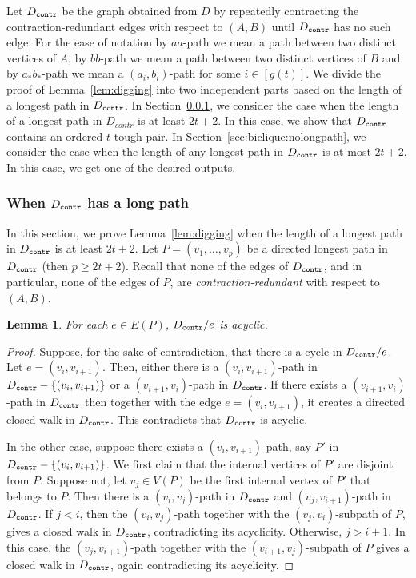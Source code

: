 \documentclass[a4paper,11pt]{article}
\theoremstyle{plain}
\newtheorem{lemma}[theorem]{Lemma}
\newtheorem{identification rule}{Identification Rule}
\theoremstyle{definition}
\theoremstyle{remark}
\newcommand{\toughpair}{tough-pair}
\newcommand{\contr}{\textnormal{\texttt{contr}}}
\newcommand{\Dcontr}{D_{\contr}}
\begin{document}
Let $\Dcontr$ be the graph obtained from $D$ by repeatedly contracting the contraction-redundant edges with respect to $(A,B)$ until $\Dcontr$ has no such edge. 
For the ease of notation by $aa$-path we mean a path between two distinct vertices of $A$, by $bb$-path we mean a path between two distinct vertices of $B$ and by $a_{\ast}b_{\ast}$-path we mean a $(a_i,b_i)$-path for some $i \in [g(t)]$.
We divide the proof of Lemma~\ref{lem:digging} into two independent parts based on the length of a longest path in $\Dcontr$. In Section~\ref{sec:biclique:longpath}, we consider the case when the length of a longest path in $D_{contr}$ is at least $2t+2$.
In this case, we show that $\Dcontr$ contains an ordered $t$-\toughpair.
In Section~\ref{sec:biclique:nolongpath}, we consider the case when the length of any longest path in $\Dcontr$ is at most $2t+2$. In this case, we get one of the desired outputs.

\subsubsection{When $\Dcontr$ has a long path}\label{sec:biclique:longpath}

In this section, we prove Lemma~\ref{lem:digging} when the length of a longest path in $\Dcontr$ is at least $2t+2$.
Let $P=(v_1, \ldots,v_p)$
be a directed longest path in $\Dcontr$ (then $p \geq 2t+2$).
Recall that none of the edges of $\Dcontr$, and in particular, none  of the edges of $P$, are {\em contraction-redundant} with respect to $(A,B)$.

\begin{lemma}\label{claim:biclique1}
For each $e \in E(P)$, $\Dcontr/e$ is acyclic.
\end{lemma}

\begin{proof}
Suppose, for the sake of contradiction, that there is a cycle in $\Dcontr/e$. Let $e=(v_i,v_{i+1})$. 
Then, either there is a $(v_i,v_{i+1})$-path in $\Dcontr - \{(v_i,v_{i+1})\}$ or a $(v_{i+1},v_i)$-path in $\Dcontr$. 
If there exists a $(v_{i+1},v_i)$-path in $\Dcontr$ then together with the edge $e=(v_i,v_{i+1})$, it creates a directed closed walk in $\Dcontr$. 
This contradicts that $\Dcontr$ is acyclic. 

In the other case, suppose there exists a $(v_i,v_{i+1})$-path, say $P'$ in $\Dcontr -\{(v_i,v_{i+1})\}$. We first claim that the internal vertices of $P'$ are disjoint from $P$. Suppose not, let $v_j \in V(P)$ be the first internal vertex of $P'$ that belongs to $P$. Then there is a $(v_i,v_j)$-path in $\Dcontr$ and $(v_j,v_{i+1})$-path in $\Dcontr$. If $j<i$, then the $(v_i,v_j)$-path together with the $(v_j,v_i)$-subpath of $P$, gives a closed walk in $\Dcontr$, contradicting its acyclicity. Otherwise, $j>i+1$. In this case, the $(v_j,v_{i+1})$-path together with the $(v_{i+1},v_j)$-subpath of $P$ gives a closed walk in $\Dcontr$, again contradicting its acyclicity.
\end{proof}
\end{document}
